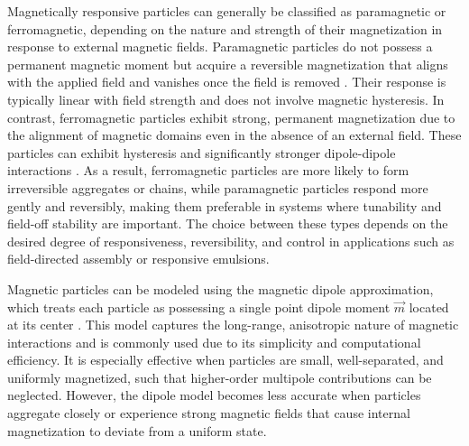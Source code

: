 Magnetically responsive particles can generally be classified as paramagnetic or ferromagnetic, depending on the nature and strength of their magnetization in response to external 
magnetic fields. Paramagnetic particles do not possess a permanent magnetic moment but acquire a reversible magnetization that aligns with the applied field and 
vanishes once the field is removed \cite{sinn_magnetically_2011}. Their response is typically linear with field strength and does not involve magnetic hysteresis. 
In contrast, ferromagnetic particles exhibit strong, permanent magnetization due to the alignment of magnetic domains even in the absence of an external field. These particles can 
exhibit hysteresis and significantly stronger dipole-dipole interactions \cite{sinn_magnetically_2011}.
As a result, ferromagnetic particles are more likely to form irreversible aggregates or chains, while paramagnetic particles 
respond more gently and reversibly, making them preferable in systems where tunability and field-off stability are important. The choice between these types depends on the desired 
degree of responsiveness, reversibility, and control in applications such as field-directed assembly or responsive emulsions.



Magnetic particles can be modeled using the magnetic dipole approximation, which treats each particle as possessing a single point dipole moment \(\vec{m}\) located at its center
\cite{davies_assembling_2014}. 
This model captures the long-range, anisotropic nature of magnetic interactions and is commonly used due to its simplicity and computational efficiency. It is especially effective when 
particles are small, well-separated, and uniformly magnetized, such that higher-order multipole contributions can be neglected. However, the dipole model becomes less accurate when particles 
aggregate closely or experience strong magnetic fields that cause internal magnetization to deviate from a uniform state.

